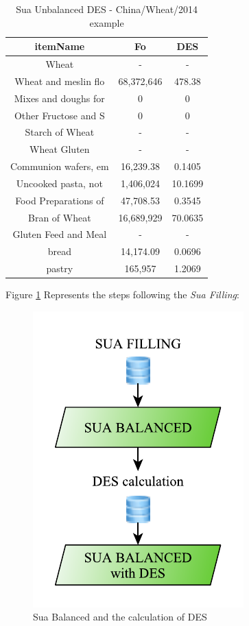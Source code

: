 \documentclass[]{article}
\begin{document}
\begin{table}

\caption{\label{tab:t19}Sua Unbalanced DES - China/Wheat/2014 example}
\centering
\begin{tabular}[t]{c|c|c}
\hline
itemName & Fo & DES\\
\hline
Wheat & - & -\\
\hline
Wheat and meslin flo & 68,372,646 & 478.38\\
\hline
Mixes and doughs for & 0 & 0\\
\hline
Other Fructose and S & 0 & 0\\
\hline
Starch of Wheat & - & -\\
\hline
Wheat Gluten & - & -\\
\hline
Communion wafers, em & 16,239.38 & 0.1405\\
\hline
Uncooked pasta, not & 1,406,024 & 10.1699\\
\hline
Food Preparations of & 47,708.53 & 0.3545\\
\hline
Bran of Wheat & 16,689,929 & 70.0635\\
\hline
Gluten Feed and Meal & - & -\\
\hline
bread & 14,174.09 & 0.0696\\
\hline
pastry & 165,957 & 1.2069\\
\hline
\end{tabular}
\end{table}

Figure \ref{fig:f8} Represents the steps following the \emph{Sua
Filling}:

\begin{figure}[H]

{\centering \includegraphics{images/StandBal/08_SuaBalanced} 

}

\caption{\label{fig:f8}Sua Balanced and the calculation of DES}\label{fig:f8}
\end{figure}
\end{document}
